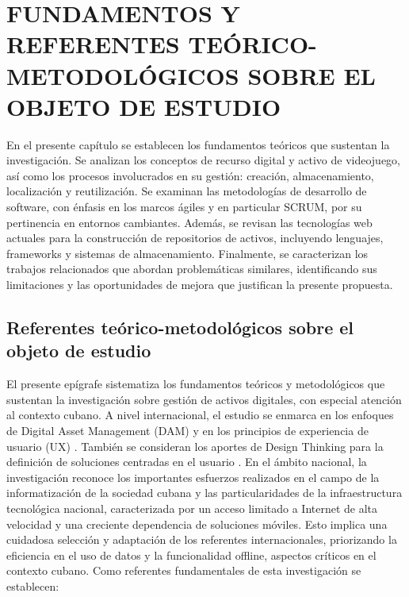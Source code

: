 ﻿\chapter{FUNDAMENTOS Y REFERENTES TEÓRICO-METODOLÓGICOS SOBRE EL OBJETO DE ESTUDIO}

\label{chap:chapter1}

En el presente capítulo se establecen los fundamentos teóricos que sustentan la investigación. Se analizan los conceptos de recurso digital y activo de videojuego, así como los procesos involucrados en su gestión: creación, almacenamiento, localización y reutilización. Se examinan las metodologías de desarrollo de software, con énfasis en los marcos ágiles y en particular SCRUM, por su pertinencia en entornos cambiantes. Además, se revisan las tecnologías web actuales para la construcción de repositorios de activos, incluyendo lenguajes, frameworks y sistemas de almacenamiento. Finalmente, se caracterizan los trabajos relacionados que abordan problemáticas similares, identificando sus limitaciones y las oportunidades de mejora que justifican la presente propuesta.
\section{Referentes teórico-metodológicos sobre el objeto de estudio}
El presente epígrafe sistematiza los fundamentos teóricos y metodológicos que sustentan la investigación sobre gestión de activos digitales, con especial atención al contexto cubano. A nivel internacional, el estudio se enmarca en los enfoques de Digital Asset Management (DAM) y en los principios de experiencia de usuario (UX) \citep{Garrett2011,Norman2013}. También se consideran los aportes de Design Thinking para la definición de soluciones centradas en el usuario \citep{Brown2008}.
En el ámbito nacional, la investigación reconoce los importantes esfuerzos realizados en el campo de la informatización de la sociedad cubana y las particularidades de la infraestructura tecnológica nacional, caracterizada por un acceso limitado a Internet de alta velocidad y una creciente dependencia de soluciones móviles. Esto implica una cuidadosa selección y adaptación de los referentes internacionales, priorizando la eficiencia en el uso de datos y la funcionalidad offline, aspectos críticos en el contexto cubano.
Como referentes fundamentales de esta investigación se establecen:

